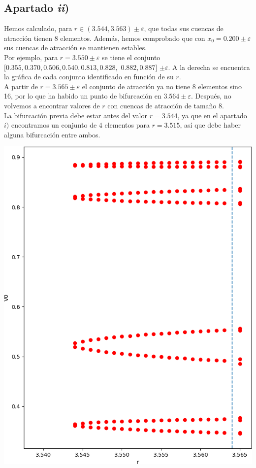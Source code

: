\documentclass[a4paper]{article}
\newenvironment{sidefig}[1]
{\noindent\begin{minipage}[c]{#1\textwidth}}
	{\vfill\end{minipage}}
\newcommand{\herefig}[1]{%
\end{minipage}
\hfill
\noindent\begin{minipage}[c]{#1\textwidth} 
	\centering\vfill
}
\begin{document}
	\subsection{Apartado \textit{ii})}%
	\begin{sidefig}{0.5}
	
	Hemos calculado, para $r\in(3.544,3.563)\pm \varepsilon$, que todas sus cuencas de atracción tienen 8 elementos. Además, hemos comprobado que con $x_0=0.200\pm \varepsilon$ sus cuencas de atracción se mantienen estables.\\[\medskipamount]
	Por ejemplo, para $r=3.550\pm \varepsilon$ se tiene el conjunto $[0.355, 0.370, 0.506, 0.540,0.813, 0.828, $ $0.882, 0.887]$ $\pm \varepsilon$. A la derecha se encuentra la gráfica de cada conjunto identificado en función de su $r$.\\[\medskipamount]
	A partir de $r=3.565\pm \varepsilon$ el conjunto de atracción ya no tiene 8 elementos sino 16, por lo que ha habido un punto de bifurcación en $3.564\pm\varepsilon$. Después, no volvemos a encontrar valores de $r$ con cuencas de atracción de tamaño 8.\\[\medskipamount]
	La bifurcación previa debe estar antes del valor $r=3.544$, ya que en el apartado $i)$ encontramos un conjunto de 4 elementos para $r=3.515$, así que debe haber alguna bifurcación entre ambos.
	
	\herefig{0.45}
	
	\includegraphics[width=\linewidth]{grafica}
	
	\end{sidefig}\vspace*{\smallskipamount}
\end{document}
